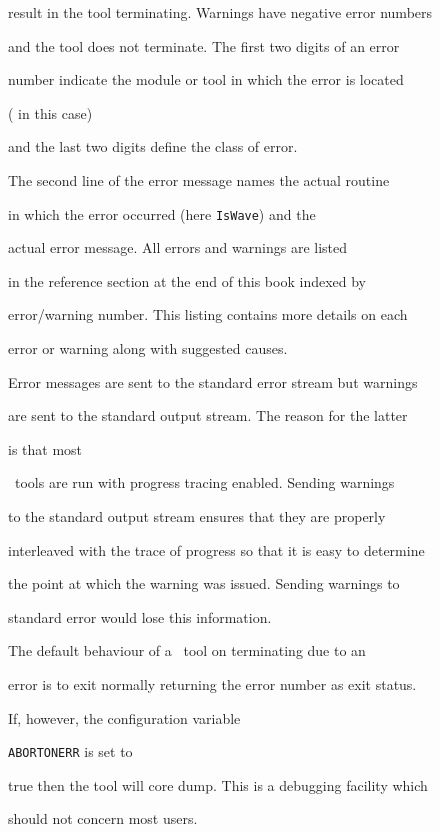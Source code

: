 result in the tool terminating.  Warnings have negative error numbers


and the tool does not terminate.  The first two digits of an error


number indicate the module or tool in which the error is located


( in this case)


and the last two digits define the class of error.


The second line of the error message names the actual routine


in which the error occurred (here \texttt{IsWave}) and the 


actual error message.    All errors and warnings are listed


in the reference section at the end of this book indexed by


error/warning number.  This listing contains more details on each


error or warning along with suggested causes.





Error messages are sent to the  standard error stream but warnings


are sent to the standard output stream.  The reason for the latter


is that most 


\HTK\ tools are run with progress tracing enabled.  Sending warnings


to the standard output stream ensures that they are properly


interleaved with the trace of progress so that it is easy to determine


the point at which the warning was issued.  Sending warnings to


standard error would lose this information.





The default behaviour of a \HTK\ tool on terminating due to an


error is to exit normally returning the error number as exit status.


If, however, the configuration variable 


\texttt{ABORTONERR} is set to


true then the tool will core dump.  This is a debugging facility which


should not concern most users.





